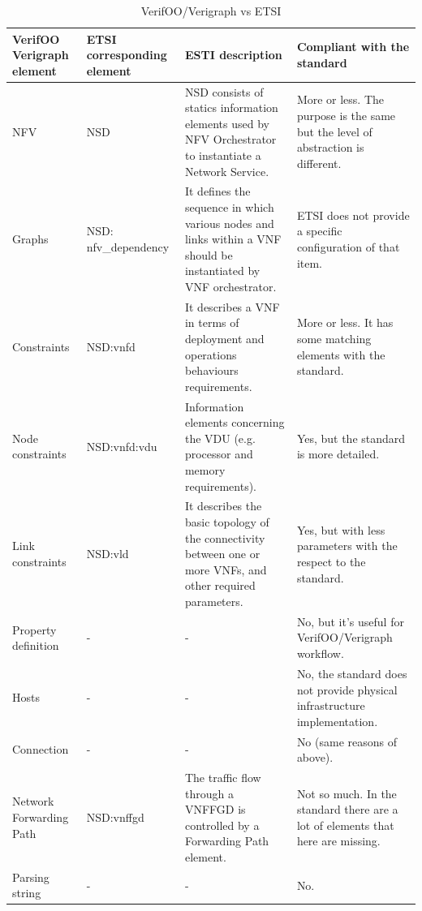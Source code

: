 \documentclass[11pt, english]{article}
\begin{document}
\begin{table}[!h]
    \centering
    \begin{tabular}{ m{2cm}|m{3cm}|m{4cm}|m{5cm} }
    \hline
    VerifOO Verigraph element & ETSI corresponding element & ESTI description & Compliant with the standard \\
    \hline
    \rowcolor{Gray}
    NFV & NSD & NSD consists of statics information elements used by NFV Orchestrator to instantiate a Network Service. & More or less. The purpose is the same but the level of abstraction is different. \\
    \hline
    Graphs & NSD: nfv\_dependency & It defines the sequence in which various nodes and links within a VNF should be instantiated by VNF orchestrator. & ETSI does not provide a specific configuration of that item. \\
    \hline
    \rowcolor{Gray}
    Constraints & NSD:vnfd & It describes a VNF in terms of deployment and operations behaviours requirements. & More or less. It has some matching elements with the standard. \\
    \hline
    Node constraints & NSD:vnfd:vdu & Information elements concerning the VDU (e.g. processor and memory requirements). & Yes, but the standard is more detailed. \\
    \hline
    \rowcolor{Gray}
    Link constraints & NSD:vld & It describes the basic topology of the connectivity between one or more VNFs, and other required parameters. & Yes, but with less parameters with the respect to the standard. \\
    \hline
    Property definition & - & - & No, but it's useful for VerifOO/Verigraph workflow. \\
    \hline
    \rowcolor{Gray}
    Hosts & - & - & No, the standard does not provide physical infrastructure implementation. \\
    \hline
    Connection & - & - & No (same reasons of above). \\
    \hline
    \rowcolor{Gray}
    Network Forwarding Path & NSD:vnffgd & The traffic flow through a VNFFGD is controlled by a Forwarding Path element. & Not so much. In the standard there are a lot of elements that here are missing. \\
    \hline
    Parsing string & - & - & No. \\
    \hline
    \end{tabular}
    \caption{VerifOO/Verigraph vs ETSI} \label{tab:tab0}
\end{table}
\end{document}
